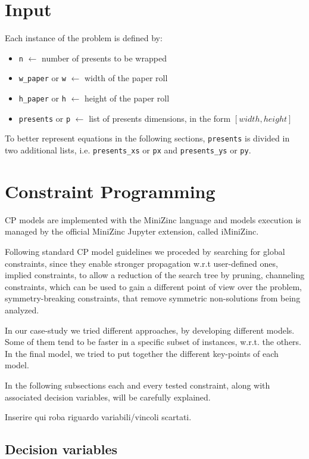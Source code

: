 \documentclass[a4paper,10pt]{article}
\begin{document}
\section{Input}
Each instance of the problem is defined by:
\begin{itemize}
   \item \texttt{n} $\longleftarrow$ number of presents to be wrapped
   \item \texttt{w\_paper} or \texttt{w} $\longleftarrow$ width of the paper roll
   \item \texttt{h\_paper} or \texttt{h} $\longleftarrow$ height of the paper roll
   \item \texttt{presents} or \texttt{p} $\longleftarrow$ list of presents dimensions, in the form $[width,height]$
\end{itemize}

To better represent equations in the following sections, \texttt{presents} is divided in two additional lists, i.e. \texttt{presents\_xs} or \texttt{px} and \texttt{presents\_ys} or \texttt{py}.

\section{Constraint Programming}
CP models are implemented with the MiniZinc language and models execution is managed by the official MiniZinc Jupyter extension, called iMiniZinc.

Following standard CP model guidelines we proceded by searching for global constraints, since they enable stronger propagation w.r.t user-defined ones, implied constraints, to allow a reduction of the search tree by pruning, channeling constraints, which can be used to gain a different point of view over the problem, symmetry-breaking constraints, that remove symmetric non-solutions from being analyzed.

In our case-study we tried different approaches, by developing different models. Some of them tend to be faster in a specific subset of instances, w.r.t. the others. In the final model, we tried to put together the different key-points of each model.

In the following subsections each and every tested constraint, along with associated decision variables, will be carefully explained.

Inserire qui roba riguardo variabili/vincoli scartati.

\subsection{Decision variables}
\end{document}
